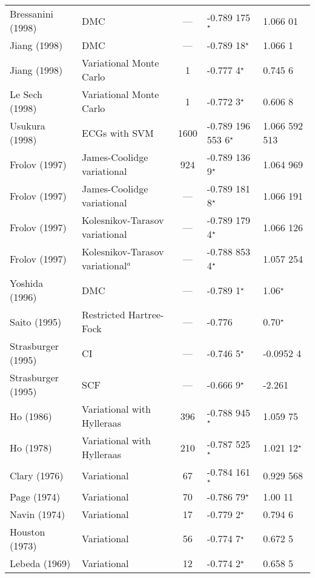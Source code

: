 \documentclass[Dissertation.tex]{subfiles}
\begin{document}
\begin{center}
\begin{longtable}{l l c l l}
Bressanini (1998) \cite{Bressanini1998} & DMC & --- & -0.789 175$^\star$ & 1.066 01 \\
Jiang (1998) \cite{Jiang1998} & DMC & --- & -0.789 18$^\star$ & 1.066 1 \\
Jiang (1998) \cite{Jiang1998} & Variational Monte Carlo & 1 & -0.777 4$^\star$ & 0.745 6 \\
Le Sech (1998) \cite{LeSech1998} & Variational Monte Carlo & 1 & -0.772 3$^\star$ & 0.606 8 \\
Usukura (1998) \cite{Usukura1998} & ECGs with SVM & 1600 & -0.789 196 553 6$^\star$ & 1.066 592 513 \\
Frolov (1997) \cite{Frolov1997a} & James-Coolidge variational & 924 & -0.789 136 9$^\star$ & 1.064 969 \\
Frolov (1997) \cite{Frolov1997a} & James-Coolidge variational & --- & -0.789 181 8$^\star$ & 1.066 191 \\
Frolov (1997) \cite{Frolov1997c} & Kolesnikov-Tarasov variational & --- & -0.789 179 4$^\star$ & 1.066 126 \\
Frolov (1997) \cite{Frolov1997c} & Kolesnikov-Tarasov variational$^a$ & --- & -0.788 853 4$^\star$ & 1.057 254 \\
Yoshida (1996) \cite{Yoshida1996} & DMC & --- & -0.789 1$^\star$ & 1.06$^\star$ \\
Saito (1995) \cite{Saito1995} & Restricted Hartree-Fock & --- & -0.776 & 0.70$^\star$ \\
Strasburger (1995) \cite{Strasburger1995} & CI & --- & -0.746 5$^\star$ & -0.0952 4 \\
Strasburger (1995) \cite{Strasburger1995} & SCF & --- & -0.666 9$^\star$ & -2.261 \\
Ho (1986) \cite{Ho1986} & Variational with Hylleraas & 396 & -0.788 945$^\star$ & 1.059 75 \\*
Ho (1978) \cite{Ho1978} & Variational with Hylleraas & 210 & -0.787 525$^\star$ & 1.021 12$^\star$ \\*
Clary (1976) \cite{Clary1976} & Variational & 67 & -0.784 161$^\star$ & 0.929 568 \\*
Page (1974) \cite{Page1974} & Variational & 70 & -0.786 79$^\star$ & 1.00 11 \\*
Navin (1974) \cite{Navin1974} & Variational & 17 & -0.779 2$^\star$ & 0.794 6 \\*
Houston (1973) \cite{Houston1973} & Variational & 56 & -0.774 7$^\star$ & 0.672 5 \\*
Lebeda (1969) \cite{Lebeda1969} & Variational & 12 & -0.774 2$^\star$ & 0.658 5 \\*

\end{longtable}
\end{center}
\end{document}
